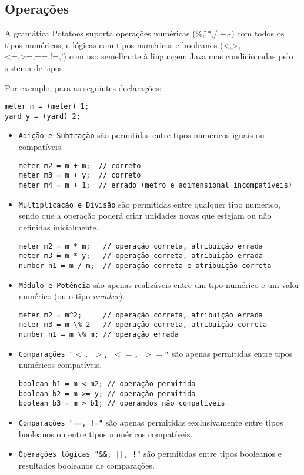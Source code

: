 \documentclass{report}
\begin{document}
\subsection{Operações}
A gramática Potatoes suporta operações numéricas (\%,\^,*,/,+,-) com todos os tipos numéricos, e lógicas com tipos numéricos e booleanos (<,>,<=,>=,==,!=,!) com uso semelhante à linguagem Java mas condicionadas pelo sistema de tipos.

Por exemplo, para as seguintes declarações:
\begin{lstlisting}
meter m = (meter) 1;
yard y = (yard) 2;
\end{lstlisting}

\begin{itemize}

\item \texttt{Adição e Subtração} são permitidas entre tipos numéricos iguais ou compatíveis.
\begin{lstlisting}
meter m2 = m + m;  // correto
meter m3 = m + y;  // correto
meter m4 = m + 1;  // errado (metro e adimensional incompatíveis)
\end{lstlisting}

\item \texttt{Multiplicação e Divisão} são permitidas entre qualquer tipo numérico, sendo que a operação poderá criar unidades novas que estejam ou não definidas inicialmente.
\begin{lstlisting}
meter m2 = m * m;   // operação correta, atribuição errada
meter m3 = m * y;   // operação correta, atribuição errada
number n1 = m / m;  // operação correta e atribuição correta
\end{lstlisting}

\item \texttt{Módulo e Potência} são apenas realizáveis entre um tipo numérico e um valor numérico (ou o tipo \textit{number}).
\begin{lstlisting}[mathescape=true]
meter m2 = m^2;     // operação correta, atribuição errada
meter m3 = m \% 2   // operação correta, atribuição correta
number n1 = m \% m; // operação errada
\end{lstlisting}

\item \texttt{Comparações "$<$, $>$, $<=$, $>=$"} são apenas permitidas entre tipos numéricos compatíveis.
\begin{lstlisting}
boolean b1 = m < m2; // operação permitida
boolean b2 = m >= y; // operação permitida
boolean b3 = m > b1; // operandos não compatíveis
\end{lstlisting}

\item \texttt{Comparações "==, !="} são apenas permitidas exclusivamente entre tipos booleanos ou entre tipos numéricos compatíveis.

\item \texttt{Operações lógicas "\&\&, ||, !"} são permitidas entre tipos booleanos e resultados booleanos de comparações. 
    
\end{itemize}
\end{document}
